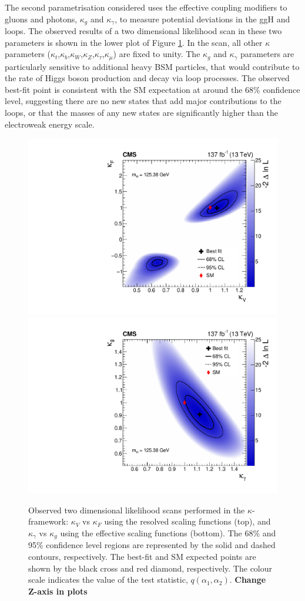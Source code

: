 The second parametrisation considered uses the effective coupling modifiers to gluons and photons, $\kappa_g$ and $\kappa_\gamma$, to measure potential deviations in the ggH and \Hgg loops. The observed results of a two dimensional likelihood scan in these two parameters is shown in the lower plot of Figure \ref{fig:2d_kappa}. In the scan, all other $\kappa$ parameters ($\kappa_t$,$\kappa_b$,$\kappa_W$,$\kappa_Z$,$\kappa_\tau$,$\kappa_\mu$) are fixed to unity. The $\kappa_g$ and $\kappa_\gamma$ parameters are particularly sensitive to additional heavy BSM particles, that would contribute to the rate of Higgs boson production and decay via loop processes. The observed best-fit point is consistent with the SM expectation at around the 68\% confidence level, suggesting there are no new states that add major contributions to the loops, or that the masses of any new states are significantly higher than the electroweak energy scale.

\begin{figure}[htbp]
  \centering
  \includegraphics[width=.65\textwidth]{Figures/hgg_results/scan2D_syst_obs_kappa_V_vs_kappa_F_obs.pdf}
  \includegraphics[width=.65\textwidth]{Figures/hgg_results/scan2D_syst_obs_kappa_gam_vs_kappa_g_obs.pdf}
  \caption[Two dimensional likelihood scans in the coupling modifier parametrisation]
  {
    Observed two dimensional likelihood scans performed in the $\kappa$-framework: $\kappa_V$ vs $\kappa_F$ using the resolved scaling functions (top), and $\kappa_\gamma$ vs $\kappa_g$ using the effective scaling functions (bottom). The 68\% and 95\% confidence level regions are represented by the solid and dashed contours, respectively. The best-fit and SM expected points are shown by the black cross and red diamond, respectively. The colour scale indicates the value of the test statistic, $q(\alpha_1,\alpha_2)$. \textbf{Change Z-axis in plots}
  }
  \label{fig:2d_kappa}
\end{figure}

